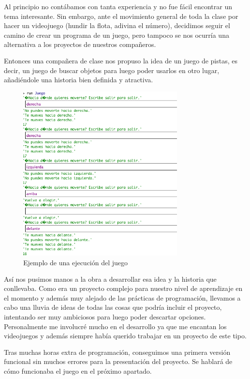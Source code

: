 \documentclass[12pt]{article}
\begin{document}
Al principio no contábamos con tanta experiencia y no fue fácil encontrar un tema interesante. Sin embargo, ante el movimiento general de toda la clase por hacer un videojuego (hundir la flota, adivina el número), decidimos seguir el camino de crear un programa de un juego, pero tampoco se nos ocurría una alternativa a los proyectos de nuestros compañeros.

Entonces una compañera de clase nos propuso la idea de un juego de pistas, es decir, un juego de buscar objetos para luego poder usarlos en otro lugar, añadiéndole una historia bien definida y atractiva.

\begin{figure}[h]
	\caption{Ejemplo de una ejecución del juego}
	\centering
	\includegraphics[width=0.75\textwidth]{primerJuegoCaptura.png}
\end{figure}

Así nos pusimos manos a la obra a desarrollar esa idea y la historia que conllevaba. Como era un proyecto complejo para nuestro nivel de aprendizaje en el momento y además muy alejado de las prácticas de programación, llevamos a cabo una lluvia de ideas de todas las cosas que podría incluir el proyecto, intentando ser muy ambiciosos para luego poder descartar opciones.
Personalmente me involucré mucho en el desarrollo ya que me encantan los videojuegos y además siempre había querido trabajar en un proyecto de este tipo.

Tras muchas horas extra de programación, conseguimos una primera versión funcional sin muchos errores para la presentación del proyecto. Se hablará de cómo funcionaba el juego en el próximo apartado.
\end{document}
